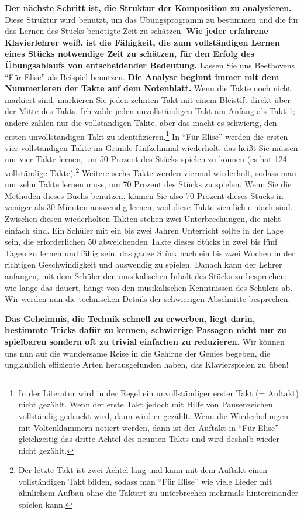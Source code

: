 \textbf{Der nächste Schritt ist, die Struktur der Komposition zu analysieren.}
Diese Struktur wird benutzt, um das Übungsprogramm zu bestimmen und die für das Lernen des Stücks benötigte Zeit zu schätzen.
\textbf{Wie jeder erfahrene Klavierlehrer weiß, ist die Fähigkeit, die zum vollständigen Lernen eines Stücks notwendige Zeit zu schätzen, für den Erfolg des Übungsablaufs von entscheidender Bedeutung.}
Lassen Sie uns Beethovens \enquote{Für Elise} als Beispiel benutzen.
\textbf{Die Analyse beginnt immer mit dem Nummerieren der Takte auf dem Notenblatt.}
Wenn die Takte noch nicht markiert sind, markieren Sie jeden zehnten Takt mit einem Bleistift direkt über der Mitte des Takts.
Ich zähle jeden unvollständigen Takt am Anfang als Takt 1; andere zählen nur die vollständigen Takte, aber das macht es schwierig, den ersten unvollständigen Takt zu identifizieren.\footnote{In der Literatur wird in der Regel ein  unvollständiger erster Takt (= Auftakt) nicht gezählt.
Wenn der erste Takt jedoch mit Hilfe von Pausenzeichen vollständig gedruckt wird, dann wird er gezählt.
Wenn die Wiederholungen mit Voltenklammern notiert werden, dann ist der Auftakt in \enquote{Für Elise} gleichzeitig das dritte Achtel des neunten Takts und wird deshalb wieder nicht gezählt.}
In \enquote{Für Elise} werden die ersten vier vollständigen Takte im Grunde fünfzehnmal wiederholt, das heißt Sie müssen nur vier Takte lernen, um 50 Prozent des Stücks spielen zu können (es hat 124 vollständige Takte).\footnote{Der letzte Takt ist zwei Achtel lang und kann mit dem Auftakt einen vollständigen Takt bilden, sodass man \enquote{Für Elise} wie viele Lieder mit ähnlichem Aufbau ohne die Taktart zu unterbrechen mehrmals hintereinander spielen kann.}
Weitere sechs Takte werden viermal wiederholt, sodass man nur zehn Takte lernen muss, um 70 Prozent des Stücks zu spielen.
Wenn Sie die Methoden dieses Buchs benutzen, können Sie also 70 Prozent dieses Stücks in weniger als 30 Minuten auswendig lernen, weil diese Takte ziemlich einfach sind.
Zwischen diesen wiederholten Takten stehen zwei Unterbrechungen, die nicht einfach sind.
Ein Schüler mit ein bis zwei Jahren Unterricht sollte in der Lage sein, die erforderlichen 50 abweichenden Takte dieses Stücks in zwei bis fünf Tagen zu lernen und fähig sein, das ganze Stück nach ein bis zwei Wochen in der richtigen Geschwindigkeit und auswendig zu spielen.
Danach kann der Lehrer anfangen, mit dem Schüler den musikalischen Inhalt des Stücks zu besprechen; wie lange das dauert, hängt von den musikalischen Kenntnissen des Schülers ab.
Wir werden nun die technischen Details der schwierigen Abschnitte besprechen.

\textbf{Das Geheimnis, die Technik schnell zu erwerben, liegt darin, bestimmte Tricks dafür zu kennen, schwierige Passagen nicht nur zu spielbaren sondern oft zu trivial einfachen zu reduzieren.}
Wir können uns nun auf die wundersame Reise in die Gehirne der Genies begeben, die unglaublich effiziente Arten herausgefunden haben, das Klavierspielen zu üben!



